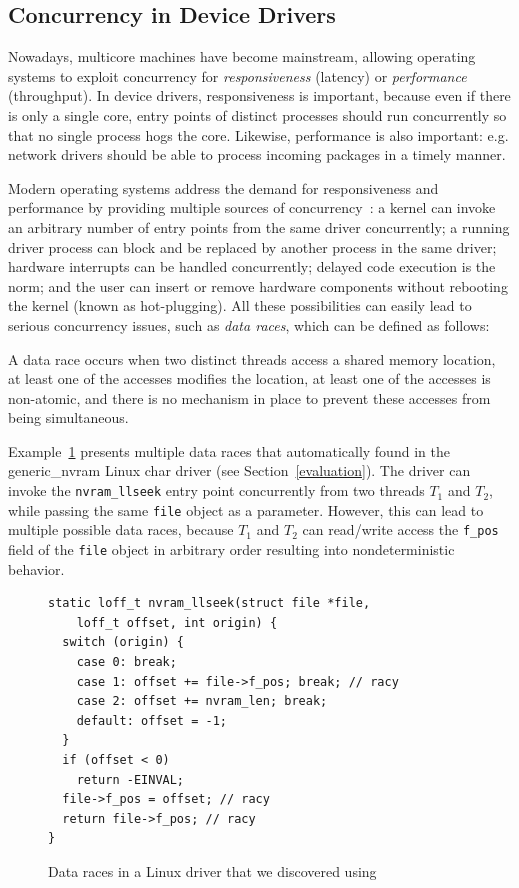 \subsection{Concurrency in Device Drivers}
\label{bg:concurrency}

Nowadays, multicore machines have become mainstream, allowing operating systems to exploit concurrency for \emph{responsiveness} (latency) or \emph{performance} (throughput). In device drivers, responsiveness is important, because even if there is only a single core, entry points of distinct processes should run concurrently so that no single process hogs the core. Likewise, performance is also important: e.g. network drivers should be able to process incoming packages in a timely manner.

Modern operating systems address the demand for responsiveness and performance by providing multiple sources of concurrency~\cite{corbet2005linux}: a kernel can invoke an arbitrary number of entry points from the same driver concurrently; a running driver process can block and be replaced by another process in the same driver; hardware interrupts can be handled concurrently; delayed code execution is the norm; and the user can insert or remove hardware components without rebooting the kernel (known as hot-plugging). All these possibilities can easily lead to serious concurrency issues, such as \emph{data races}, which can be defined as follows:

\begin{definition}
\label{definition:datarace}
A data race occurs when two distinct threads access a shared memory location, at least one of the accesses modifies the location, at least one of the accesses is non-atomic, and there is no mechanism in place to prevent these accesses from being simultaneous.
\end{definition}

Example~\ref{fig:data_race_example} presents multiple data races that \whoop automatically found in the generic\_nvram Linux char driver (see Section~\ref{evaluation}). The driver can invoke the \texttt{nvram\_llseek} entry point concurrently from two threads $T_1$ and $T_2$, while passing the same \texttt{file} object as a parameter. However, this can lead to multiple possible data races, because $T_1$ and $T_2$ can read/write access the \texttt{f\_pos} field of the \texttt{file} object in arbitrary order resulting into nondeterministic behavior.

\begin{figure}[t]
\begin{lstlisting}
static loff_t nvram_llseek(struct file *file,
    loff_t offset, int origin) {
  switch (origin) {
    case 0: break;
    case 1: offset += file->f_pos; break; // racy
    case 2: offset += nvram_len; break;
    default: offset = -1;
  }
  if (offset < 0)
    return -EINVAL;
  file->f_pos = offset; // racy
  return file->f_pos; // racy
}
\end{lstlisting}
\caption{Data races in a Linux driver that we discovered using \whoop}\label{fig:data_race_example}
\end{figure}

